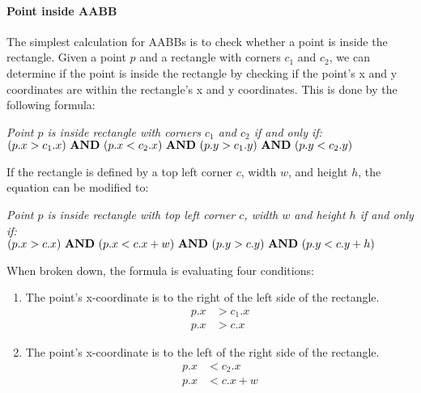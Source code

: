 \documentclass{article}
\renewcommand{\land}{\,\,\textrm{\textbf{AND}}\,\,}
\begin{document}
\paragraph*{Point inside AABB}

The simplest calculation for AABBs is to check whether a point is inside the
rectangle. Given a point $p$ and a rectangle with corners $c_1$ and $c_2$, we
can determine if the point is inside the rectangle by checking if the point's x
and y coordinates are within the rectangle's x and y coordinates. This is done
by the following formula:
\begin{center}
    \textit{Point $p$ is inside rectangle with corners $c_1$ and $c_2$ if and only if:} \\
    $(p.x > c_1.x) \land (p.x < c_2.x) \land (p.y > c_1.y) \land (p.y < c_2.y)$
\end{center}

If the rectangle is defined by a top left corner $c$, width $w$, and height
$h$, the equation can be modified to:

\begin{center}
    \textit{Point $p$ is inside rectangle with top left corner $c$, width $w$ and height $h$ if and only if:} \\
    $(p.x > c.x) \land (p.x < c.x + w) \land (p.y > c.y) \land (p.y < c.y + h)$
\end{center}
When broken down, the formula is evaluating four conditions:
\begin{multicols}{2}
    \begin{enumerate}
        \item The point's x-coordinate is to the right of the left side of the rectangle.
              \begin{equation*}
                  \begin{aligned}
                      p.x & > c_1.x \\
                      p.x & > c.x
                  \end{aligned}
              \end{equation*}

        \item The point's x-coordinate is to the left of the right side of the rectangle.
              \begin{equation*}
                  \begin{aligned}
                      p.x & < c_2.x   \\
                      p.x & < c.x + w
                  \end{aligned}
              \end{equation*}
    \end{enumerate}
\end{multicols}
\end{document}

